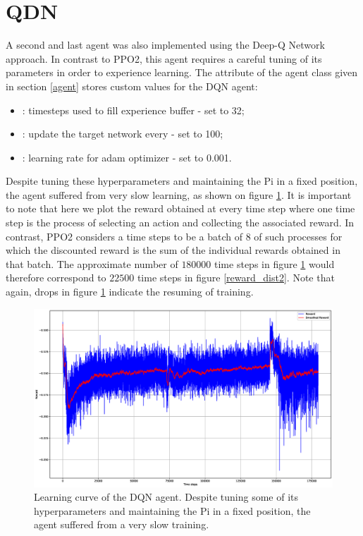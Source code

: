\section{QDN}

A second and last agent was also implemented using the Deep-Q Network approach. In contrast to PPO2, this agent requires a careful tuning of its parameters in order to experience learning. The \texttt{} attribute of the agent class given in section \ref{agent} stores custom values for the DQN agent:

\begin{itemize}
	\item \texttt{}: timesteps used to fill experience buffer - set to 32;
	\item \texttt{}: update the target network every - set to 100;
	\item \texttt{} : learning rate for adam optimizer - set to 0.001.
\end{itemize}

Despite tuning these hyperparameters and maintaining the Pi in a fixed position, the agent suffered from very slow learning, as shown on figure \ref{reward_dist3}. It is important to note that here we plot the reward obtained at every time step where one time step is the process of selecting an action and collecting the associated reward. In contrast, PPO2 considers a time steps to be a batch of 8 of such processes for which the discounted reward is the sum of the individual rewards obtained in that batch. The approximate number of $180000$ time steps in figure \ref{reward_dist3} would therefore correspond to $22500$ time steps in figure \ref{reward_dist2}. Note that again, drops in figure \ref{reward_dist3} indicate the resuming of training.

\begin{figure}[H]
	\centering
	\includegraphics[scale=0.2]{Images/dqn.eps}
	\caption{Learning curve of the DQN agent. Despite tuning some of its hyperparameters and maintaining the Pi in a fixed position, the agent suffered from a very slow training.}
	\label{reward_dist3}
\end{figure}

